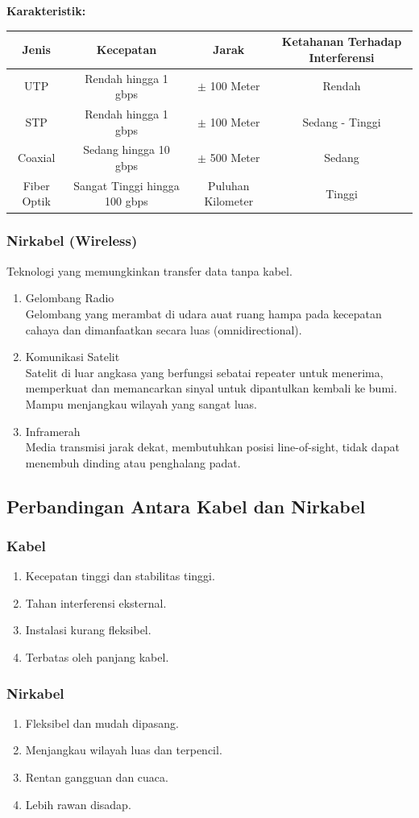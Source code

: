 \textbf{Karakteristik: }
\begin{table}[H]
  \centering
  \begin{tabular}{cccc}
    \toprule
    \textbf{Jenis} & \textbf{Kecepatan} & \textbf{Jarak} & \textbf{Ketahanan Terhadap Interferensi} \\
    \midrule
    UTP & Rendah hingga 1 gbps & $\pm$ 100 Meter & Rendah  \\
    STP & Rendah hingga 1 gbps & $\pm$ 100 Meter & Sedang - Tinggi  \\
    Coaxial & Sedang hingga 10 gbps & $\pm$ 500 Meter & Sedang  \\
    Fiber Optik & Sangat Tinggi hingga 100 gbps & Puluhan Kilometer & Tinggi \\
    \bottomrule
  \end{tabular}
\end{table}

\subsubsection{Nirkabel (Wireless)}
Teknologi yang memungkinkan transfer data tanpa kabel.
\begin{enumerate}
\item Gelombang Radio \\
  Gelombang yang merambat di udara auat ruang hampa pada kecepatan cahaya dan dimanfaatkan secara luas (omnidirectional).
\item Komunikasi Satelit \\
  Satelit di luar angkasa yang berfungsi sebatai repeater untuk menerima, memperkuat dan memancarkan sinyal untuk dipantulkan kembali ke bumi. Mampu menjangkau wilayah yang sangat luas.
\item Inframerah \\
  Media transmisi jarak dekat, membutuhkan posisi line-of-sight, tidak dapat menembuh dinding atau penghalang padat.
\end{enumerate}

\subsection{Perbandingan Antara Kabel dan Nirkabel}
\subsubsection{Kabel}
\begin{enumerate}
\item Kecepatan tinggi dan stabilitas tinggi.
\item Tahan interferensi eksternal.
\item Instalasi kurang fleksibel.
\item Terbatas oleh panjang kabel.
\end{enumerate}
\subsubsection{Nirkabel}
\begin{enumerate}
\item Fleksibel dan mudah dipasang.
\item Menjangkau wilayah luas dan terpencil.
\item Rentan gangguan dan cuaca.
\item Lebih rawan disadap.
\end{enumerate}
